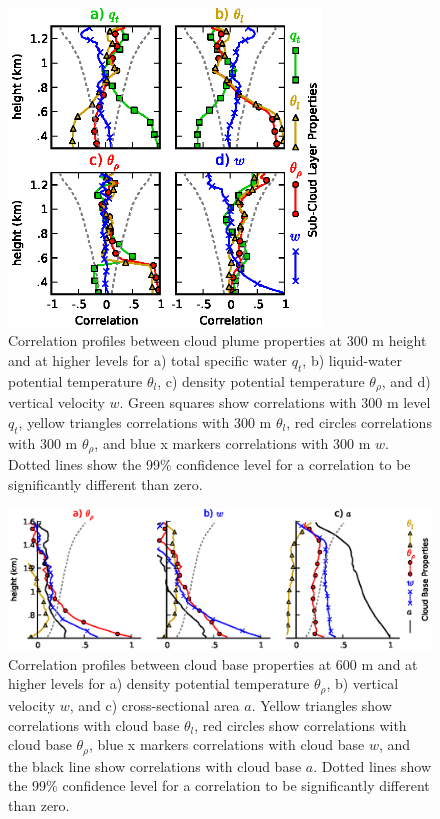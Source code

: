 \documentclass[acp]{copernicus}
\begin{document}
\begin{figure}[t]
\vspace*{2mm}
\begin{center}
\includegraphics[width=8.3cm]{./figures/sub_cloud_profiles}
\end{center}
\caption{Correlation profiles between cloud plume properties at 300 m height 
and at higher levels for a) total specific water $q_t$, b) liquid-water 
potential temperature $\theta_l$, c) density potential temperature 
$\theta_\rho$, and d) vertical velocity $w$.  Green squares show correlations 
with 300 m level $q_t$, yellow triangles correlations with 300 m $\theta_l$, 
red circles correlations with 300 m $\theta_\rho$, and blue x markers 
correlations with 300 m $w$.  Dotted lines show the 99\% confidence level for 
a correlation to be significantly different than zero.}
\label{fig:sub_cloud_profiles}
\end{figure}

\begin{figure}[t]
\vspace*{2mm}
\begin{center}
\includegraphics[width=\textwidth]{./figures/cloud_base_profiles}
\end{center}
\caption{Correlation profiles between cloud base properties at 600 m and 
at higher levels for a) density potential temperature $\theta_\rho$, b) 
vertical velocity $w$, and c) cross-sectional area $a$.  Yellow triangles show 
correlations with cloud base $\theta_l$, red circles show correlations with 
cloud base $\theta_\rho$, blue x markers correlations with cloud base $w$, 
and the black line show correlations with cloud base $a$. Dotted lines show the 
99\% confidence level for a correlation to be significantly different than 
zero.}
\label{fig:cloud_base_profiles}
\end{figure}
\end{document}
